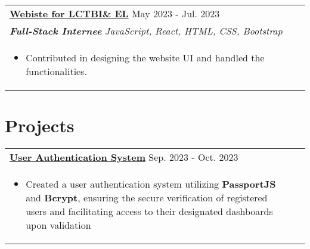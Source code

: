 \documentclass[a4paper,8pt]{article}
\begin{document}
\begin{tabularx}{\linewidth}{ @{}l r@{} }
\color[HTML]{1C033C} \textbf{\uline{Webiste for LCTBI\& EL}} \hfill \color[HTML]{1C033C} May 2023 - Jul. 2023 \\[4pt]
\color[HTML]{1C033C}\textbf{\textit{Full-Stack Internee}} \hfill \color[HTML]{4B28A4} \textit{JavaScript, React, HTML, CSS, Bootstrap} \\[5pt]
\begin{minipage}[t]{\linewidth}
    \begin{itemize}[nosep,after=\strut, leftmargin=2em, itemsep=2pt]
       \color[HTML]{1C033C} \item Contributed in designing the website UI and handled the functionalities.
    \end{itemize}
    \end{minipage}\end{tabularx}

\color[HTML]{318CE7}\section{\textbf{Projects}}
\begin{tabularx}{\linewidth}{ @{}l r@{} }
\color[HTML]{1C033C} \textbf{\uline{\href{https://github.com/thisIsSrijan/User-Authentication}{User Authentication System}}} \hfill \color[HTML]{1C033C} Sep. 2023 - Oct. 2023 \\[4pt]
\begin{minipage}[t]{\linewidth}
    \begin{itemize}[nosep,after=\strut, leftmargin=2em, itemsep=2pt]
        \color[HTML]{1C033C}\item Created a user authentication system utilizing \textbf{PassportJS} and \textbf{Bcrypt}, ensuring the secure verification of registered users and facilitating access to their designated dashboards upon validation
    \end{itemize}
    \end{minipage}\end{tabularx}
\end{document}
